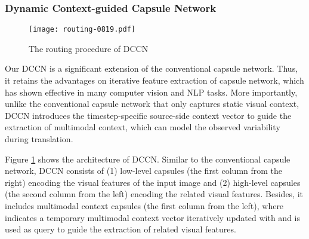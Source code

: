 \documentclass[sigconf]{acmart}
\begin{document}
\subsubsection{Dynamic Context-guided Capsule Network}\label{sec_dccn}

\begin{figure}[t]
\centering
\texttt{[image: routing-0819.pdf]} 
\caption{The routing procedure of DCCN}
\label{Fig_capsmall}
\end{figure}






Our DCCN is a significant extension of the conventional capsule network. 
Thus, it retains the advantages on iterative feature extraction of capsule network, 
which has shown effective in many computer vision  \cite{DBLP:conf/iclr/XinyiC19,DBLP:conf/eccv/LiGDOW18,DBLP:conf/iccv/SinghN0V19,DBLP:journals/spl/XiangZTZX18,DBLP:conf/eccv/JaiswalA0N18,DBLP:journals/corr/abs-1812-00303} and NLP \cite{DBLP:conf/iclr/XinyiC19,chen2019transfer,yang-etal-2018-investigating,aly2019hierarchical,DBLP:conf/emnlp/YangZMGFZ19,DBLP:conf/emnlp/ZhengHTDC19,DBLP:conf/emnlp/Wang19} tasks. 
More importantly, unlike the conventional capsule network that only captures static visual context, DCCN introduces the timestep-specific source-side context vector to guide the extraction of multimodal context, which can model the observed variability during translation.


Figure \ref{Fig_capsmall} shows the architecture of DCCN. 
Similar to the conventional capsule network, DCCN consists of 
(1) low-level capsules  (the first column from the right) encoding the visual features of the input image and 
(2) high-level capsules  (the second column from the left) encoding the related visual features. 
Besides, it includes multimodal context capsules  (the first column from the left), where  indicates a temporary multimodal context vector iteratively updated with  and is used as query to guide the extraction of related visual features. 
\end{document}
